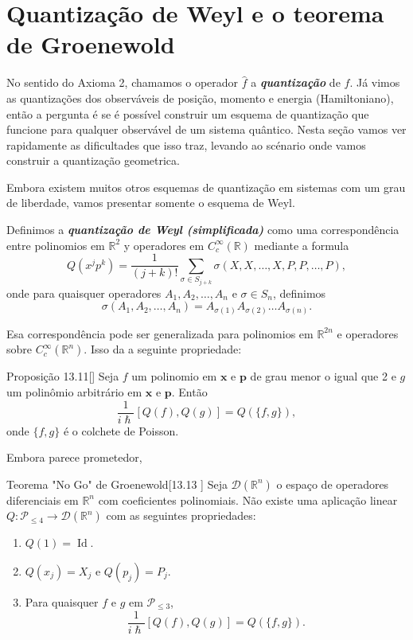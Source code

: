 \section{Quantização de Weyl e o teorema de Groenewold}

No sentido do Axioma 2, chamamos o operador $\hat{f}$ a \textit{\textbf{quantização}} de $f$. Já vimos as quantizações dos observáveis de posição, momento e energia (Hamiltoniano), então a pergunta é se é possível construir um esquema de quantização que funcione para qualquer observável de um sistema quântico. Nesta seção vamos ver rapidamente as dificultades que isso traz, levando ao scénario onde vamos construir a quantização geometrica.

Embora existem muitos otros esquemas de quantização em sistemas com um grau de liberdade, vamos presentar somente o esquema de Weyl.

\begin{defn}\leavevmode
Definimos a \textit{\textbf{quantização de Weyl (simplificada)}} como uma correspondência entre polinomios em $\mathbb{R}^{2}$ y operadores em $C^\infty_c(\mathbb{R})$ mediante a formula
\[Q(x^jp^k)=\frac{1}{(j+k)!}\sum_{\sigma\in S_{j+k}}\sigma(X,X,\ldots,X,P,P,\ldots,P),\]
onde para quaisquer operadores $A_1,A_2,\ldots,A_n$ e $\sigma \in S_n$, definimos
\[\sigma(A_1,A_2,\ldots,A_n)=A_{\sigma(1)}A_{\sigma(2)}\ldots A_{\sigma(n)}.\]
\end{defn}

Esa correspondência pode ser generalizada para polinomios em $\mathbb{R}^{2n}$ e operadores sobre $C^\infty_c(\mathbb{R}^n)$. Isso da a seguinte propriedade:

\begin{thing4}{Proposição 13.11}[\cite{hallq}]\leavevmode
Seja $f$ um polinomio em $\mathbf{x}$ e $\mathbf{p}$ de grau menor o igual que 2 e $g$ um polinômio arbitrário em $\mathbf{x}$ e $\mathbf{p}$. Então
\[\frac{1}{i \hslash}[Q(f),Q(g)]=Q(\{f,g\}),\]
onde $\{f,g\}$ é o colchete de Poisson.
\end{thing4}

Embora parece prometedor,

\begin{thing5}{Teorema "No Go" de Groenewold}[13.13 \cite{hallq}]\leavevmode
Seja $\mathcal{D}(\mathbb{R}^{n})$ o espaço de operadores diferenciais em $\mathbb{R}^n$ com coeficientes polinomiais. Não existe uma aplicação linear $Q:\mathcal{P}_{\leq 4}\to \mathcal{D}(\mathbb{R}^n)$ com as seguintes propriedades:
\begin{enumerate}
\item $Q(1)=\operatorname{Id}$.
\item $Q(x_j)=X_j$ e $Q(p_j)=P_j$.
\item Para quaisquer $f$ e $g$ em $\mathcal{P}_{\leq 3}$, 
	\[\frac{1}{i\hslash}[Q(f),Q(g)]=Q(\{f,g\}).\]
\end{enumerate}
\end{thing5}

